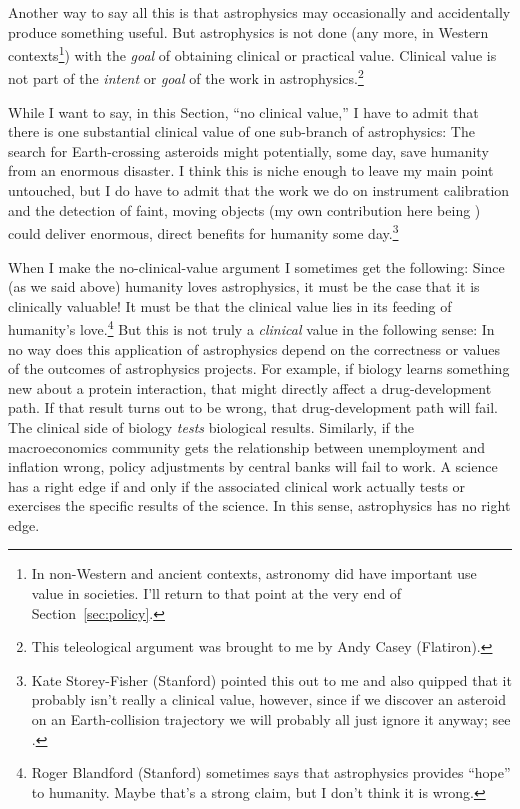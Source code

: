\documentclass{article}
\newcommand{\sectionname}{Section}
\newcommand{\secref}[1]{\sectionname~\ref{#1}}
\begin{document}
Another way to say all this is that astrophysics may occasionally and accidentally produce something useful.
But astrophysics is not done (any more, in Western contexts\footnote{%
In non-Western and ancient contexts, astronomy did have important use value in societies.
I'll return to that point at the very end of \secref{sec:policy}.})
with the \emph{goal} of obtaining clinical or practical value.
Clinical value is not part of the \emph{intent} or \emph{goal} of the work in astrophysics.\footnote{This teleological argument was brought to me by Andy Casey (Flatiron).}

While I want to say, in this \sectionname, ``no clinical value,''
I have to admit that there is one substantial clinical value of one sub-branch of astrophysics:
The search for Earth-crossing asteroids might potentially, some day, save humanity from an enormous disaster.
I think this is niche enough to leave my main point untouched,
but I do have to admit that the work we do on instrument calibration and the detection of faint, moving objects (my own contribution here being \cite{undetectable}) could deliver enormous, direct benefits for humanity some day.\footnote{%
Kate Storey-Fisher (Stanford) pointed this out to me and also quipped that it probably isn't really a clinical value, however,
since if we discover an asteroid on an Earth-collision trajectory we will probably all just ignore it anyway; see \cite{dontlook}.}

When I make the no-clinical-value argument I sometimes get the following:
Since (as we said above) humanity loves astrophysics, it must be the case that it is clinically valuable!
It must be that the clinical value lies in its feeding of humanity's love.\footnote{%
Roger Blandford (Stanford) sometimes says that astrophysics provides ``hope'' to humanity.
Maybe that's a strong claim, but I don't think it is wrong.}
But this is not truly a \emph{clinical} value in the following sense:
In no way does this application of astrophysics depend on the correctness or values of the outcomes of astrophysics projects.
For example, if biology learns something new about a protein interaction, that might directly affect a drug-development path.
If that result turns out to be wrong, that drug-development path will fail.
The clinical side of biology \emph{tests} biological results.
Similarly, if the macroeconomics community gets the relationship between unemployment and inflation wrong, policy adjustments by central banks will fail to work.
A science has a right edge if and only if the associated clinical work actually tests or exercises the specific results of the science.
In this sense, astrophysics has no right edge.
\end{document}
